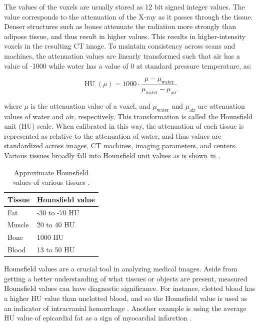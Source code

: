 The values of the voxels are usually stored as 12 bit signed integer values. The value corresponds to the attenuation of the X-ray as it passes through the tissue. Denser structures such as bones attenuate the radiation more strongly than adipose tissue, and thus result in higher values. This results in higher-intensity voxels in the resulting CT image. To maintain consistency across scans and machines, the attenuation values are linearly transformed such that air has a value of -1000 while water has a value of 0 at standard pressure temperature, as:

\begin{equation}
	{\operatorname{HU}(\mu)}=1000 \cdot {\frac {\mu -\mu _{\textrm {water}}}{\mu _{\textrm {water}}-\mu _{\textrm {air}}}}
\end{equation}

where $\mu$ is the attenuation value of a voxel, and $\mu _{\textrm {water}}$ and $\mu _{\textrm {air}}$ are attenuation values of water and air, respectively. This transformation is called the Hounsfield unit (HU) scale. When calibrated in this way, the attenuation of each tissue is represented as relative to the attenuation of water, and thus values are standardized across images, CT machines, imaging parameters, and centers. Various tissues broadly fall into Hounsfield unit values as is shown in .

\begin{table}[h!]
\centering
\begin{tabular}{l l} 
 \hline
 \textbf{Tissue} & \textbf{Hounsfield value} \\
 \hline
 Fat & -30 to -70 HU\\
 Muscle & 20 to 40 HU\\
 Bone & 1000 HU \\
 Blood & 13 to 50 HU\\
 \hline
\end{tabular}
\caption{Approximate Hounsfield values of various tissues \cite{fosbinder2011essentials, kamalianComputedTomographyImaging2016}.}
\label{tab:hu-tissues}
\end{table}

Hounsfield values are a crucial tool in analyzing medical images. Aside from getting a better understanding of what tissues or objects are present, measured Hounsfield values can have diagnostic significance. For instance, clotted blood has a higher HU value than unclotted blood, and so the Hounsfield value is used as an indicator of intracranial hemorrhage \cite{kamalianComputedTomographyImaging2016}. Another example is using the average HU value of epicardial fat as a sign of myocardial infarction \cite{mahabadiCardiacComputedTomographyderived2017}.

